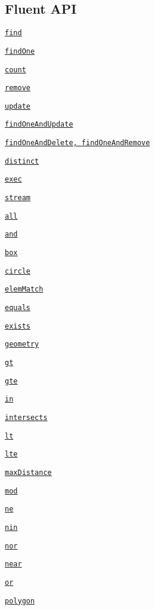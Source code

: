 \subsection*{Fluent A\+PI}


\begin{DoxyItemize}
\item \href{#find}{\tt find}
\item \href{#findOne}{\tt find\+One}
\item \href{#count}{\tt count}
\item \href{#remove}{\tt remove}
\item \href{#update}{\tt update}
\item \href{#findoneandupdate}{\tt find\+One\+And\+Update}
\item \href{#findoneandremove}{\tt find\+One\+And\+Delete, find\+One\+And\+Remove}
\item \href{#distinct}{\tt distinct}
\item \href{#exec}{\tt exec}
\item \href{#stream}{\tt stream}
\item \href{#all}{\tt all}
\item \href{#and}{\tt and}
\item \href{#box}{\tt box}
\item \href{#circle}{\tt circle}
\item \href{#elemmatch}{\tt elem\+Match}
\item \href{#equals}{\tt equals}
\item \href{#exists}{\tt exists}
\item \href{#geometry}{\tt geometry}
\item \href{#gt}{\tt gt}
\item \href{#gte}{\tt gte}
\item \href{#in}{\tt in}
\item \href{#intersects}{\tt intersects}
\item \href{#lt}{\tt lt}
\item \href{#lte}{\tt lte}
\item \href{#maxdistance}{\tt max\+Distance}
\item \href{#mod}{\tt mod}
\item \href{#ne}{\tt ne}
\item \href{#nin}{\tt nin}
\item \href{#nor}{\tt nor}
\item \href{#near}{\tt near}
\item \href{#or}{\tt or}
\item \href{#polygon}{\tt polygon}

\end{DoxyItemize}
